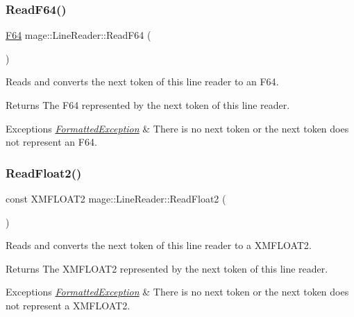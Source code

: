 \subsubsection{\texorpdfstring{Read\+F64()}{ReadF64()}}
{\footnotesize\ttfamily \hyperlink{namespacemage_ad26233bbec640deda836e572c1a23708}{F64} mage\+::\+Line\+Reader\+::\+Read\+F64 (\begin{DoxyParamCaption}{ }\end{DoxyParamCaption})\hspace{0.3cm}{\ttfamily [protected]}}

Reads and converts the next token of this line reader to an {\ttfamily F64}.

\begin{DoxyReturn}{Returns}
The {\ttfamily F64} represented by the next token of this line reader. 
\end{DoxyReturn}

\begin{DoxyExceptions}{Exceptions}
{\em \hyperlink{structmage_1_1_formatted_exception}{Formatted\+Exception}} & There is no next token or the next token does not represent an {\ttfamily F64}. \\
\hline
\end{DoxyExceptions}
\hypertarget{classmage_1_1_line_reader_ae33effd33fad465616e3acf8acdc408f}{}\label{classmage_1_1_line_reader_ae33effd33fad465616e3acf8acdc408f} 
\subsubsection{\texorpdfstring{Read\+Float2()}{ReadFloat2()}}
{\footnotesize\ttfamily const X\+M\+F\+L\+O\+A\+T2 mage\+::\+Line\+Reader\+::\+Read\+Float2 (\begin{DoxyParamCaption}{ }\end{DoxyParamCaption})\hspace{0.3cm}{\ttfamily [protected]}}

Reads and converts the next token of this line reader to a {\ttfamily X\+M\+F\+L\+O\+A\+T2}.

\begin{DoxyReturn}{Returns}
The {\ttfamily X\+M\+F\+L\+O\+A\+T2} represented by the next token of this line reader. 
\end{DoxyReturn}

\begin{DoxyExceptions}{Exceptions}
{\em \hyperlink{structmage_1_1_formatted_exception}{Formatted\+Exception}} & There is no next token or the next token does not represent a {\ttfamily X\+M\+F\+L\+O\+A\+T2}. \\
\hline
\end{DoxyExceptions}
\hypertarget{classmage_1_1_line_reader_a7a605a7c2402051f1ca4fda1e543fc28}{}\label{classmage_1_1_line_reader_a7a605a7c2402051f1ca4fda1e543fc28} 
